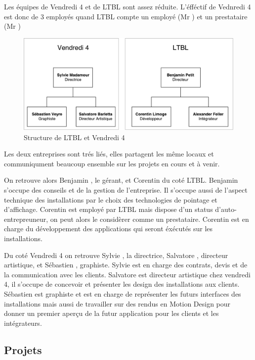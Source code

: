 \documentclass{article}
\begin{document}
Les équipes de Vendredi 4 et de LTBL sont assez réduite.
L'éfféctif de Vednredi 4 est donc de 3 employés quand LTBL compte un employé (Mr ) et un prestataire (Mr )

\begin{figure}[h]
    \centering
    \includegraphics[scale=0.7]{Structure-LTBL.pdf}
    \caption{Structure de LTBL et Vendredi 4}
\end{figure}

Les deux entreprises sont trés liés, elles partagent les même locaux et communiqument beaucoup ensemble sur les projets en cours et à venir.

On retrouve alors Benjamin , le gérant, et Corentin  du coté LTBL.
Benjamin s'occupe des conseils et de la gestion de l'entreprise.
Il s'occupe aussi de l'aspect technique des installations par le choix des technologies de pointage et d'affichage.
Corentin est employé par LTBL mais dispose d'un status d'auto-entrepreuneur, on peut alors le considèrer comme un prestataire.
Corentin est en charge du développement des applications qui seront éxécutés sur les installations.

Du coté Vendredi 4 on retrouve Sylvie , la directrice, Salvatore , directeur artistique, et Sébastien , graphiste.
Sylvie est en charge des contrats, devis et de la communication avec les clients.
Salvatore est directeur artistique chez vendredi 4, il s'occupe de concevoir et présenter les design des installations aux clients.
Sébastien est graphiste et est en charge de représenter les futurs interfaces des installations mais aussi de travailler sur des rendus en Motion Design pour donner un premier aperçu de la futur application pour les clients et les intégrateurs.

\subsection{Projets}
\end{document}
